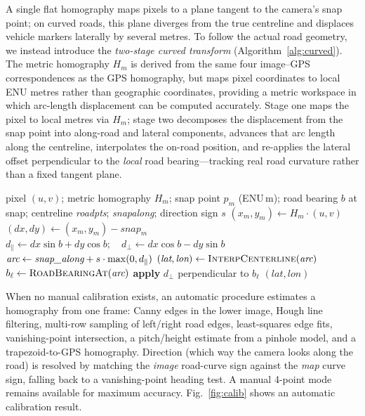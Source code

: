\documentclass[conference]{IEEEtran}
\renewcommand{\_}{\textunderscore\allowbreak}
\begin{document}
A single flat homography maps pixels to a plane tangent to the camera's snap
point; on curved roads, this plane diverges from the true centreline and displaces
vehicle markers laterally by several metres. To follow the actual road geometry, we
instead introduce the \emph{two-stage curved transform}
(Algorithm~\ref{alg:curved}). The metric homography $H_m$ is derived from the same
four image--GPS correspondences as the GPS homography, but maps pixel coordinates
to local ENU metres rather than geographic coordinates, providing a metric workspace
in which arc-length displacement can be computed accurately. Stage one maps the
pixel to local metres via $H_m$; stage two decomposes the displacement from the
snap point into along-road and lateral components, advances that arc length along
the centreline, interpolates the on-road position, and re-applies the lateral
offset perpendicular to the \emph{local} road bearing---tracking real road
curvature rather than a fixed tangent plane.

\begin{algorithm}[t]
\caption{Two-stage curved pixel$\to$GPS transform}
\label{alg:curved}
\begin{algorithmic}[1]
\Require pixel $(u,v)$; metric homography $H_m$; snap point $p_m$ (ENU\,m);
         road bearing $b$ at snap; centreline \textit{road\_pts};
         \textit{snap\_along}; direction sign $s$
\State $(x_m,y_m) \gets H_m \cdot (u,v)$
\State $(dx,dy) \gets (x_m,y_m) - \textit{snap}_m$ 
\State $d_{\parallel} \gets dx\sin b + dy\cos b;\quad d_{\perp} \gets dx\cos b - dy\sin b$
\State $\textit{arc} \gets \textit{snap\_along} + s\cdot \max(0,d_{\parallel})$
\State $(\textit{lat},\textit{lon}) \gets \textsc{InterpCenterline}(\textit{arc})$
\State $b_\ell \gets \textsc{RoadBearingAt}(\textit{arc})$
\State \textbf{apply} $d_{\perp}$ perpendicular to $b_\ell$ \Return $(\textit{lat},\textit{lon})$
\end{algorithmic}
\end{algorithm}

When no manual calibration exists, an automatic procedure estimates a homography
from one frame: Canny edges in the lower image, Hough line filtering, multi-row
sampling of left/right road edges, least-squares edge fits, vanishing-point
intersection, a pitch/height estimate from a pinhole model, and a trapezoid-to-GPS
homography. Direction (which way the camera looks along the road) is resolved by
matching the \emph{image} road-curve sign against the \emph{map} curve sign, falling
back to a vanishing-point heading test. A manual 4-point mode remains available for
maximum accuracy. Fig.~\ref{fig:calib} shows an automatic calibration result.
\end{document}
